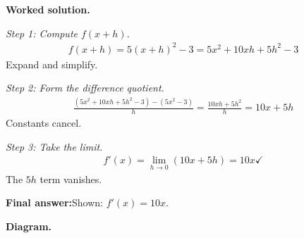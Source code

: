 \documentclass[11pt]{article}
\begin{document}
\textbf{Worked solution.}

\textit{Step 1: Compute \( f(x+h) \).}
\[\begin{gathered}
f(x+h) = 5(x+h)^2 - 3 = 5x^2 + 10xh + 5h^2 - 3
\end{gathered}\]
Expand and simplify.

\textit{Step 2: Form the difference quotient.}
\[\begin{gathered}
\frac{(5x^2 + 10xh + 5h^2 - 3) - (5x^2 - 3)}{h} = \frac{10xh + 5h^2}{h} = 10x + 5h
\end{gathered}\]
Constants cancel.

\textit{Step 3: Take the limit.}
\[\begin{gathered}
f'(x) = \lim_{h \to 0}(10x + 5h) = 10x \checkmark
\end{gathered}\]
The \( 5h \) term vanishes.

\begin{answerbox}
\textbf{Final answer:}\quad Shown: \(\displaystyle  f'(x) = 10x \).
\end{answerbox}
\textbf{Diagram.}
\end{document}
